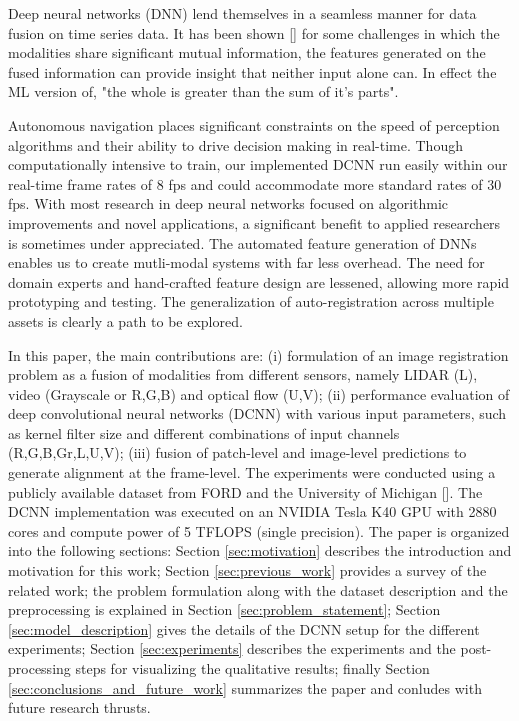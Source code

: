 \documentclass{article}
\begin{document}
Deep neural networks (DNN) lend themselves in a seamless manner for data fusion on time series data. It has been shown [\cite{Ngiam2011Multimodal}] for some challenges in which the modalities share significant mutual information, the features generated on the fused information can provide insight that neither input alone can. In effect the ML version of, "the whole is greater than the sum of it's parts". 

Autonomous navigation places significant constraints on the speed of perception algorithms and their ability to drive decision making in real-time. Though computationally intensive to train, our implemented DCNN run easily within our real-time frame rates of 8 fps and could accommodate more standard rates of 30 fps. 
With most research in deep neural networks focused on algorithmic improvements and novel applications, a significant benefit to applied researchers is sometimes under appreciated. The automated feature generation of DNNs enables us to create mutli-modal systems with far less overhead. The need for domain experts and hand-crafted feature design are lessened, allowing more rapid prototyping and testing. The generalization of auto-registration across multiple assets is clearly a path to be explored. 

In this paper, the main contributions are: (i) formulation of an image registration problem as a fusion of modalities from different sensors, namely LIDAR (L), video (Grayscale or R,G,B) and optical flow (U,V); (ii) performance evaluation of deep convolutional neural networks (DCNN) with various input parameters, such as kernel filter size and different combinations of input channels (R,G,B,Gr,L,U,V); (iii) fusion of patch-level and image-level predictions to generate alignment at the frame-level. The experiments were conducted using a publicly available dataset from FORD and the University of Michigan [\cite{Pandey2011Ford-Campu}]. The DCNN implementation was executed on an NVIDIA Tesla K40 GPU with 2880 cores and compute power of 5 TFLOPS (single precision). The paper is organized into the following sections: Section \ref{sec:motivation} describes the introduction and motivation for this work; Section \ref{sec:previous_work} provides a survey of the related work; the problem formulation along with the dataset description and the preprocessing is explained in Section \ref{sec:problem_statement}; Section \ref{sec:model_description} gives the details of the DCNN setup for the different experiments; Section \ref{sec:experiments} describes the experiments and the post-processing steps for visualizing the qualitative results; finally Section \ref{sec:conclusions_and_future_work} summarizes the paper and conludes with future research thrusts.
\end{document}
